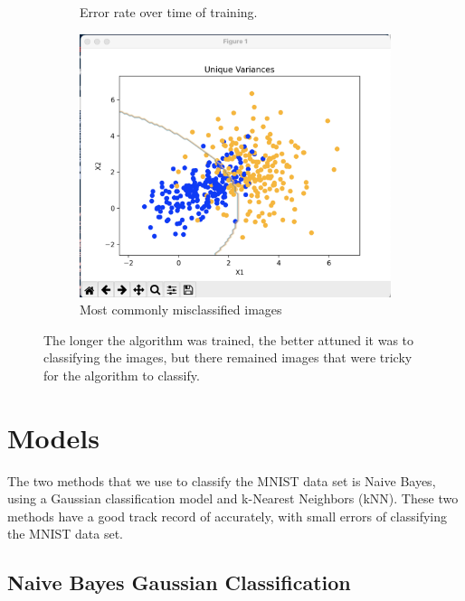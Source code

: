 \documentclass[10pt,twocolumn,letterpaper]{article}
\begin{document}
\begin{figure}
  \centering
  \begin{subfigure}{0.7\linewidth}
    \fbox{\rule{0pt}{2in} \rule{.9\linewidth}{0pt}}
    \caption{Error rate over time of training.}
    \label{fig:short-a}
  \end{subfigure}
  \begin{subfigure}{0.25\linewidth}
    \includegraphics[scale=0.25]{images/Screenshot 2023-10-20 at 20.31.04.png}
    \caption{Most commonly misclassified images}
    \label{fig:short-b}
  \end{subfigure}
  \caption{The longer the algorithm was trained, the better attuned it was to classifying the images, but there remained images that were tricky for the algorithm to classify.}
  \label{fig:short}
\end{figure}

\section{Models}
\label{sec:formatting}

The two methods that we use to classify the MNIST data set is Naive Bayes, using a Gaussian classification model and k-Nearest Neighbors (kNN). These two methods have a good track record of accurately, with small errors of classifying the MNIST data set.

\subsection{Naive Bayes Gaussian Classification}
\end{document}
